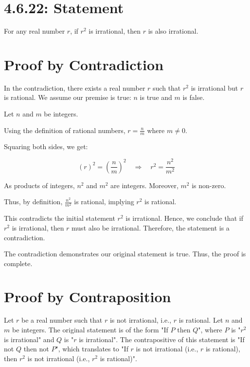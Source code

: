 \documentclass[12pt]{article}
\begin{document}
\section*{4.6.22: Statement}

For any real number \( r \), if \( r^2 \) is irrational, then \( r \) is also irrational.

\section*{Proof by Contradiction}

In the contradiction, there exists a real number \( r \) such that \( r^2 \) is irrational but \( r \) is rational. We assume our premise is true: \( n \) is true and \( m \) is false.

Let \( n \) and \( m \) be integers.

Using the definition of rational numbers, \( r = \frac{n}{m} \) where \( m \neq 0 \).

Squaring both sides, we get:

\[
(r)^2 = \left( \frac{n}{m} \right)^2 \quad \Rightarrow \quad r^2 = \frac{n^2}{m^2}
\]

As products of integers, \( n^2 \) and \( m^2 \) are integers. Moreover, \( m^2 \) is non-zero.

Thus, by definition, \( \frac{n^2}{m^2} \) is rational, implying \( r^2 \) is rational. 

This contradicts the initial statement \( r^2 \) is irrational. Hence, we conclude that if \( r^2 \) is irrational, then \( r \) must also be irrational. Therefore, the statement is a contradiction.

The contradiction demonstrates our original statement is true. Thus, the proof is complete.

\newpage
\section*{Proof by Contraposition}

Let \( r \) be a real number such that \( r \) is not irrational, i.e., \( r \) is rational. Let \( n \) and \( m \) be integers. The original statement is of the form "If \( P \) then \( Q \)", where \( P \) is "\( r^2 \) is irrational" and \( Q \) is "\( r \) is irrational". The contrapositive of this statement is "If not \( Q \) then not \( P \)", which translates to "If \( r \) is not irrational (i.e., \( r \) is rational), then \( r^2 \) is not irrational (i.e., \( r^2 \) is rational)".
\end{document}
